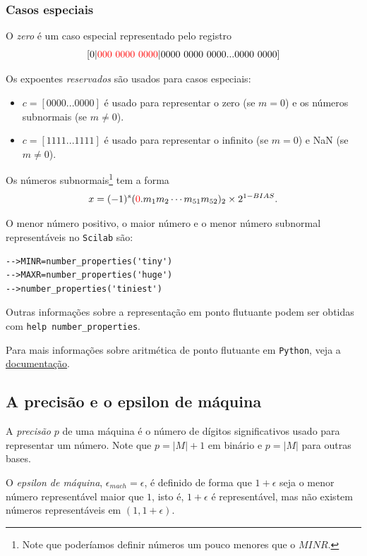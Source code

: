 \subsubsection{Casos especiais}
O \emph{zero} é um caso especial representado pelo registro 
$$
[0|{\color{red}{000~0000~0000}} |0000~0000~0000...0000~0000]
$$




Os expoentes \emph{reservados} são usados para casos especiais:
\begin{itemize}
 \item $c=[0000...0000]$ é usado para representar o zero (se $m=0$) e os números subnormais (se $m\neq 0$).
 \item $c=[1111...1111]$ é usado para representar o infinito (se $m=0$) e NaN (se $m\neq 0$).
\end{itemize}

Os números subnormais\footnote{Note que poderíamos definir números um pouco menores que o $MINR$.} tem a forma
$$ x=(-1)^{s}({\color{red}{0}}.m_{1}m_{2}\cdots m_{51}m_{52})_2 \times 2^{1-BIAS}.$$

\ifisscilab
\begin{obs}
  O menor número positivo, o maior número e o menor número subnormal representáveis  no \verb+Scilab+ são:
\begin{verbatim}
-->MINR=number_properties('tiny')
-->MAXR=number_properties('huge')
-->number_properties('tiniest')
\end{verbatim}
Outras informações sobre a representação em ponto flutuante podem ser obtidas com \verb+help number_properties+.
\end{obs}
\fi
\ifispython
Para mais informações sobre aritmética de ponto flutuante em \verb+Python+, veja a \href{https://docs.python.org/3/tutorial/floatingpoint.html?highlight=double}{documentação}.
\fi

\subsection{A precisão e o epsilon de máquina}

A \emph{precisão} $p$ de uma máquina é o número de dígitos significativos usado para representar um número. Note que $p=|M|+1$ em binário e $p=|M|$ para outras bases.

O \emph{epsilon de máquina}, $\epsilon_{mach}=\epsilon$, é definido de forma que $1+\epsilon$ seja o menor número representável maior que $1$, isto é, $1+\epsilon$ é representável, mas não existem números representáveis em $(1, 1+\epsilon)$.

